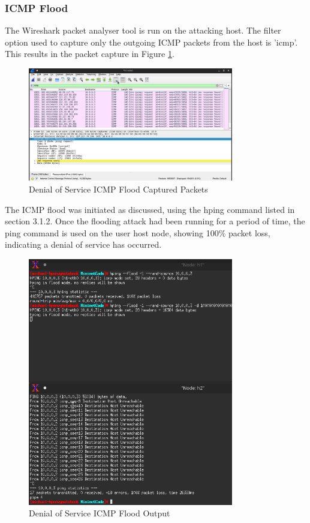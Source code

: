 \subsubsection{ICMP Flood}

The Wireshark packet analyser tool is run on the attacking host. The filter
option used to capture only the outgoing ICMP packets from the host is
'icmp'. This results in the packet capture in Figure
\ref{fig:images-icmpFloodDosWs}.

\begin{figure}[H]
	\centering
	\includegraphics[width=0.8\textwidth]{images/icmpFloodDoSWs}
	\caption{Denial of Service ICMP Flood Captured Packets}
	\label{fig:images-icmpFloodDosWs}
\end{figure}

The ICMP flood was initiated as discussed, using the hping command listed in
section 3.1.2. Once the flooding attack had been running for a period of time,
the ping command is used on the user host node, showing 100\% packet loss,
indicating a denial of service has occurred.

\begin{figure}[H]
	\centering
	\includegraphics[width=0.8\textwidth]{images/IcmpFloodDosCli}
	\caption{Denial of Service ICMP Flood Output}
	\label{fig:images-icmpFloodDosCli}
\end{figure}

